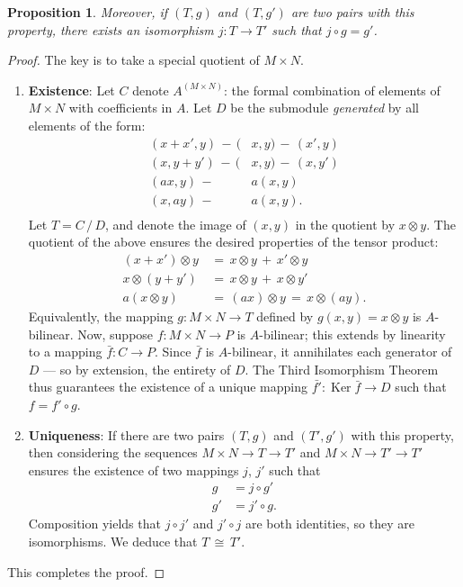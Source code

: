 \documentclass[11pt]{article}
\newtheorem{proposition}{Proposition}
\newcommand{\Ker}{\operatorname{Ker}}
\begin{document}
\begin{adjustwidth}{0.5cm}{}
\begin{proposition}
    Moreover, if $(T, g)$ and $(T, g')$ are two pairs with this property, there exists an isomorphism $j : T \to T'$ such that $j \circ g = g'$.
  \end{proposition}
  \begin{proof}
    The key is to take a special quotient of $M \times N$.
    \begin{enumerate}
      \item \textbf{Existence}: Let $C$ denote $A^{(M \times N)}$: the formal combination of elements of $M \times N$ with coefficients in $A$. Let $D$ be the submodule \textit{generated} by all elements of the form:
      \begin{align*}
        (x + x', y) \, - \, (& x, y) \, - \, (x', y) \\
        (x, y + y') \, - \, (& x, y) \, - \, (x, y') \\
        (ax, y) \, - \, & a(x, y) \\
        (x, ay) \, - \, & a(x, y). \\
      \end{align*}
      Let $T = C \, / \, D$, and denote the image of $(x, y)$ in the quotient by $x \otimes y$. The quotient of the above ensures the desired properties of the tensor product:
      \begin{align*}
        (x + x') \otimes y \, &= \, x \otimes y \, + \, x' \otimes y \\
        x \otimes (y + y') \, &= \, x \otimes y \, + \, x \otimes y' \\
            a(x \otimes y) \, &= \, (ax) \otimes y \, = \, x \otimes (ay).
      \end{align*}
      Equivalently, the mapping $g : M \times N \to T$ defined by $g(x, y) = x \otimes y$ is $A$-bilinear.
      Now, suppose $f : M \times N \to P$ is $A$-bilinear; this extends by linearity to a mapping $\bar{f} : C \to P$. Since $\bar{f}$ is $A$-bilinear, it annihilates each generator of $D$ --- so by extension, the entirety of $D$. The Third Isomorphism Theorem thus guarantees the existence of a unique mapping $\bar{f'} : \Ker \bar{f} \to D$ such that $f = f' \circ g$.

      \item \textbf{Uniqueness}: If there are two pairs $(T, g)$ and $(T', g')$ with this property, then considering the sequences $M \times N \to T \to T'$ and $M \times N \to T' \to T'$ ensures the existence of two mappings $j$, $j'$ such that
      \begin{align*}
         g &= j \circ g' \\
        g' &= j' \circ g.
      \end{align*}
      Composition yields that $j \circ j'$ and $j' \circ j$ are both identities, so they are isomorphisms. We deduce that $T \, \cong \, T'$.
    \end{enumerate} 
    This completes the proof.
  \end{proof} 
\end{adjustwidth} 
\end{document}
